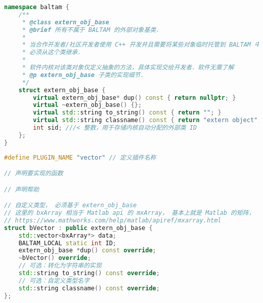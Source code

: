 
\begin{issues}
\issueDraft
\end{issues}

\begin{lstlisting}[language=cpp, caption=extern\_obj.h节选]
namespace baltam {
    /**
     * @class extern_obj_base
     * @brief 所有不属于 BALTAM 的外部对象基类．
     *
     * 当合作开发者/社区开发者使用 C++ 开发并且需要将某些对象临时托管到 BALTAM 中时，
     * 必须从这个类继承．
     *
     * 软件内核对该类对象仅定义抽象的方法，具体实现交给开发者．软件无需了解
     * @p extern_obj_base 子类的实现细节．
     */
    struct extern_obj_base {
        virtual extern_obj_base* dup() const { return nullptr; }
        virtual ~extern_obj_base() {};
        virtual std::string to_string() const { return ""; }
        virtual std::string classname() const { return "extern object"; };
        int sid; ///< 整数，用于存储内核自动分配的外部类 ID
    };
}
\end{lstlisting}


\begin{lstlisting}[language=cpp,caption=vector 插件的 main.cpp]
#define PLUGIN_NAME "vector" // 定义插件名称

// 声明要实现的函数

// 声明帮助

// 自定义类型， 必须基于 extern_obj_base
// 这里的 bxArray 相当于 Matlab api 的 mxArray， 基本上就是 Matlab 的矩阵， 什么都能装．
// https://www.mathworks.com/help/matlab/apiref/mxarray.html
struct bVector : public extern_obj_base {
    std::vector<bxArray*> data;
    BALTAM_LOCAL static int ID;
    extern_obj_base *dup() const override;
    ~bVector() override;
    // 可选：转化为字符串的实现
    std::string to_string() const override;
    // 可选：自定义类型名字
    std::string classname() const override;
};
\end{lstlisting}